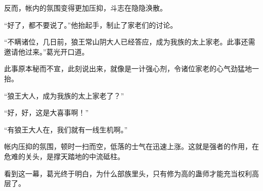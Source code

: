 \begin{this_body}
反而，帐内的氛围变得更加压抑，斗志在隐隐涣散。

“好了，都不要说了。”他抬起手，制止了家老们的讨论。

“不瞒诸位，几日前，狼王常山阴大人已经答应，成为我族的太上家老。此事还需邀请他过来。”葛光开口道。

此事原本秘而不宣，此刻说出来，就像是一计强心剂，令诸位家老的心气劲猛地一抬。

“狼王大人，成为我族的太上家老了？”

“好，好，这是大喜事啊！”

“有狼王大人在，我们就有一线生机啊。”

帐内压抑的氛围，顿时一扫而空，低落的士气在迅速上涨。这就是强者的作用，在危难的关头，是撑天踏地的中流砥柱。

看到这一幕，葛光终于明白，为什么部族里头，只有修为高的蛊师才能充当权利高层了。

\end{this_body}

